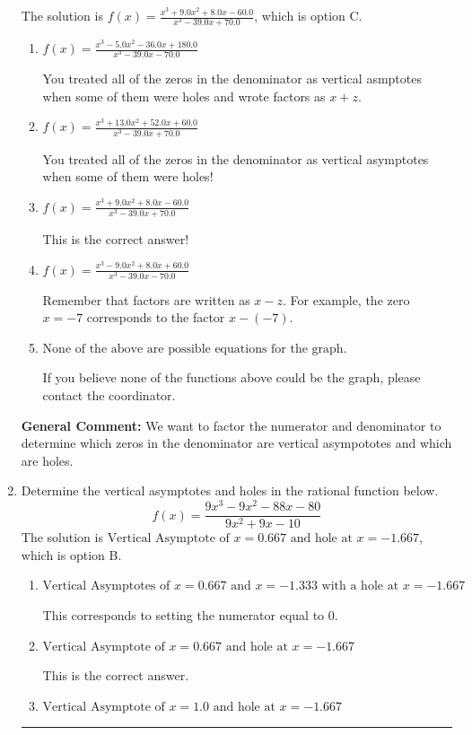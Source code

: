\documentclass{extbook}[14pt]
\newcommand{\litem}[1]{\item #1

\rule{\textwidth}{0.4pt}}
\begin{document}
\begin{enumerate}
{The solution is \( f(x)=\frac{x^{3} +9.0 x^{2} +8.0 x -60.0}{x^{3} -39.0 x + 70.0} \), which is option C.\begin{enumerate}[label=\Alph*.]
\item \( f(x)=\frac{x^{3} -5.0 x^{2} -36.0 x + 180.0}{x^{3} -39.0 x -70.0} \)

You treated all of the zeros in the denominator as vertical asmptotes when some of them were holes and wrote factors as $x+z$.
\item \( f(x)=\frac{x^{3} +13.0 x^{2} +52.0 x + 60.0}{x^{3} -39.0 x + 70.0} \)

You treated all of the zeros in the denominator as vertical asymptotes when some of them were holes!
\item \( f(x)=\frac{x^{3} +9.0 x^{2} +8.0 x -60.0}{x^{3} -39.0 x + 70.0} \)

This is the correct answer!
\item \( f(x)=\frac{x^{3} -9.0 x^{2} +8.0 x + 60.0}{x^{3} -39.0 x -70.0} \)

Remember that factors are written as $x-z$. For example, the zero $x=-7$ corresponds to the factor $x-(-7)$.
\item \( \text{None of the above are possible equations for the graph.} \)

If you believe none of the functions above could be the graph, please contact the coordinator.
\end{enumerate}

\textbf{General Comment:} We want to factor the numerator and denominator to determine which zeros in the denominator are vertical asympototes and which are holes.
}
\litem{
Determine the vertical asymptotes and holes in the rational function below.
\[ f(x) = \frac{9x^{3} -9 x^{2} -88 x -80}{9x^{2} +9 x -10} \]The solution is \( \text{Vertical Asymptote of } x = 0.667 \text{ and hole at } x = -1.667 \), which is option B.\begin{enumerate}[label=\Alph*.]
\item \( \text{Vertical Asymptotes of } x = 0.667 \text{ and } x = -1.333 \text{ with a hole at } x = -1.667 \)

This corresponds to setting the numerator equal to 0.
\item \( \text{Vertical Asymptote of } x = 0.667 \text{ and hole at } x = -1.667 \)

This is the correct answer.
\item \( \text{Vertical Asymptote of } x = 1.0 \text{ and hole at } x = -1.667 \)


\end{enumerate}}
\end{enumerate}
\end{document}
